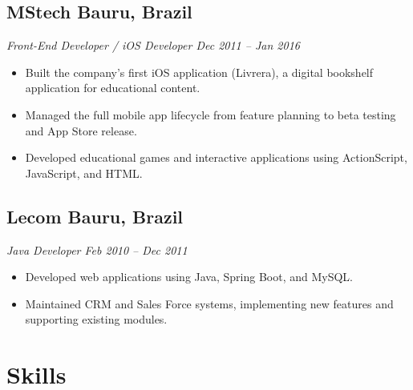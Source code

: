 \documentclass[a4paper,10pt]{article}
\begin{document}
\subsection*{\textbf{MStech} \hfill Bauru, Brazil}
\textit{Front-End Developer / iOS Developer \hfill Dec 2011 – Jan 2016}

\begin{itemize}

\item Built the company’s first iOS application (Livrera), a digital bookshelf application for educational content.

\item Managed the full mobile app lifecycle from feature planning to beta testing and App Store release.

\item Developed educational games and interactive applications using ActionScript, JavaScript, and HTML.

\end{itemize}

\subsection*{\textbf{Lecom} \hfill Bauru, Brazil}
\textit{Java Developer \hfill Feb 2010 – Dec 2011}

\begin{itemize}

\item Developed web applications using Java, Spring Boot, and MySQL.

\item Maintained CRM and Sales Force systems, implementing new features and supporting existing modules.

\end{itemize}


\section{Skills}
\end{document}
